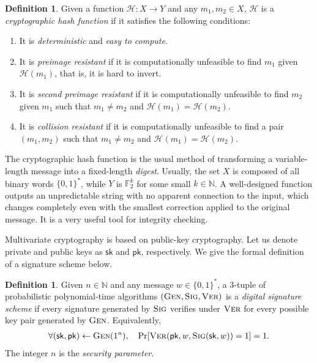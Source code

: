 \documentclass[12pt, a4paper, oneside]{memoir}
\theoremstyle{definition}
\newtheorem{definition}[theorem]{Definition}
\begin{document}
\begin{definition}
  Given a function $\mathcal{H} : X \to Y$ and any $m_{1}, m_{2} \in X$, $\mathcal{H}$ is a \emph{cryptographic hash function} if it satisfies the following conditions:
  
  \begin{enumerate}
    \item It is \emph{deterministic} and \emph{easy to compute}.
    \item It is \emph{preimage resistant} if it is computationally unfeasible to find $m_{1}$ given $\mathcal{H}(m_{1})$, that is, it is hard to invert.
    \item It is \emph{second preimage resistant} if it is computationally unfeasible to find $m_{2}$ given $m_{1}$ such that $m_{1} \neq m_{2}$ and $\mathcal{H}(m_{1}) = \mathcal{H}(m_{2})$.
    \item It is \emph{collision resistant} if it is computationally unfeasible to find a pair $(m_{1}, m_{2})$ such that $m_{1} \neq m_{2}$ and $\mathcal{H}(m_{1}) = \mathcal{H}(m_{2})$.
  \end{enumerate}
\end{definition}

The cryptographic hash function is the usual method of transforming a variable-length message into a fixed-length \emph{digest}. Usually, the set $X$ is composed of all binary words $\{0, 1\}^{*}$, while $Y$ is $\mathbb{F}_{2}^{k}$ for some small $k \in \mathbb{N}$. A well-designed function outputs an unpredictable string with no apparent connection to the input, which changes completely even with the smallest correction applied to the original message. It is a very useful tool for integrity checking.

Multivariate cryptography is based on public-key cryptography. Let us denote private and public keys as $\mathsf{sk}$ and $\mathsf{pk}$, respectively. We give the formal definition of a signature scheme below.

\begin{definition}
  Given $n \in \mathbb{N}$ and any message $w \in \{0, 1\}^{*}$, a $3$-tuple of probabilistic polynomial-time algorithms $(\textsc{Gen}, \textsc{Sig}, \textsc{Ver})$ is a \emph{digital signature scheme} if every signature generated by $\textsc{Sig}$ verifies under $\textsc{Ver}$ for every possible key pair generated by $\textsc{Gen}$. Equivalently,
  \begin{align}
     \forall (\mathsf{sk}, \mathsf{pk}) \leftarrow \textsc{Gen}(1^{n}),
       \quad \Pr[\textsc{Ver}(\mathsf{pk}, w, \textsc{Sig}(\mathsf{sk}, w)) = 1] = 1.
  \end{align}
  The integer $n$ is the \emph{security parameter}.
\end{definition}
\end{document}
